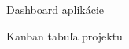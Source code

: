 \begin{figure}[H]
  \centering
  \caption{Dashboard aplikácie}
  \label{fig:ui_dashboard}
\end{figure}

\begin{figure}[H]
  \centering
  \caption{Kanban tabuľa projektu}
  \label{fig:ui_kanban}
\end{figure}
